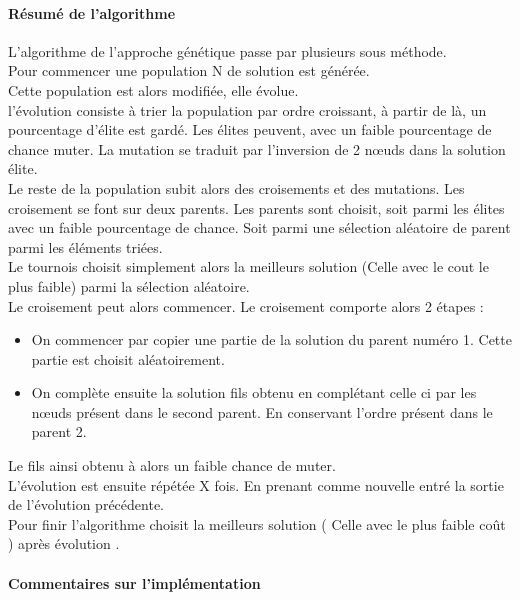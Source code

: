 \documentclass[10pt,a4paper]{report}
\begin{document}
		\paragraph{Résumé de l'algorithme\\}
		L'algorithme de l'approche génétique passe par plusieurs sous méthode. \\
		Pour commencer une population N de solution est générée. \\
		Cette population est alors modifiée, elle évolue. \\
		l'évolution consiste à trier la population par ordre croissant, à partir de là, un pourcentage d'élite est gardé. Les élites peuvent, avec un faible pourcentage de chance muter. La mutation se traduit par l'inversion de 2 nœuds dans la solution élite. \\
		Le reste de la population subit alors des croisements et des mutations. Les croisement se font sur deux parents. Les parents sont choisit, soit parmi les élites avec un faible pourcentage de chance. Soit parmi une sélection aléatoire de parent parmi les éléments triées. \\
		Le tournois choisit simplement alors la meilleurs solution (Celle avec le cout le plus faible) parmi la sélection aléatoire. \\
		
		Le croisement peut alors commencer. Le croisement comporte alors 2 étapes :
		\begin{itemize}
			\item On commencer par copier une partie de la solution du parent numéro 1. Cette partie est choisit aléatoirement.
			\item On complète ensuite la solution fils obtenu en complétant celle ci par les nœuds présent dans le second parent. En conservant l'ordre présent dans le parent 2.
		\end{itemize}
		Le fils ainsi obtenu à alors un faible chance de muter. \\
		
		L'évolution est ensuite répétée X fois. En prenant comme nouvelle entré la sortie de l'évolution précédente. \\
		Pour finir l'algorithme choisit la meilleurs solution ( Celle avec le plus faible coût ) après évolution . \\
		
		\paragraph{Commentaires sur l'implémentation\\}
\end{document}

